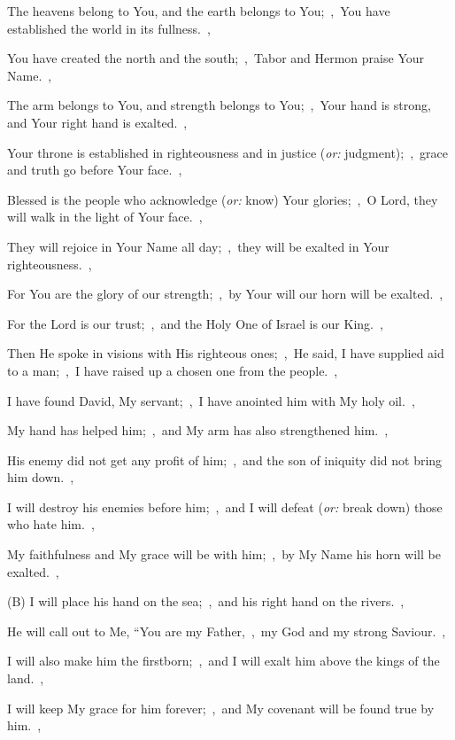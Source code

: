 \documentclass[12pt,twoside,a5paper]{article}
\newcommand{\translationoption}[1]{\emph{or:} #1}
\begin{document}
\begin{normalparskip}
  The heavens belong to You, and the earth belongs to You;~\sep\ You have established the world in its fullness.~\sep

  You have created the north and the south;~\sep\ Tabor and Hermon praise Your Name.~\sep

  The arm belongs to You, and strength belongs to You;~\sep\ Your hand is strong, and Your right hand is exalted.~\sep

  Your throne is established in righteousness and in justice (\translationoption{judgment});~\sep\ grace and truth go before Your face.~\sep

  Blessed is the people who acknowledge (\translationoption{know}) Your glories;~\sep\ O Lord, they will walk in the light of Your face.~\sep

  They will rejoice in Your Name all day;~\sep\ they will be exalted in Your righteousness.~\sep

  For You are the glory of our strength;~\sep\ by Your will our horn will be exalted.~\sep

  For the Lord is our trust;~\sep\ and the Holy One of Israel is our King.~\sep

  Then He spoke in visions with His righteous ones;~\sep\ He said, I have supplied aid to a man;~\sep\ I have raised up a chosen one from the people.~\sep

  I have found David, My servant;~\sep\ I have anointed him with My holy oil.~\sep

  My hand has helped him;~\sep\ and My arm has also strengthened him.~\sep

  His enemy did not get any profit of him;~\sep\ and the son of iniquity did not bring him down.~\sep

  I will destroy his enemies before him;~\sep\ and I will defeat (\translationoption{break down}) those who hate him.~\sep

  My faithfulness and My grace will be with him;~\sep\ by My Name his horn will be exalted.~\sep

  (B) I will place his hand on the sea;~\sep\ and his right hand on the rivers.~\sep

  He will call out to Me, ``You are my Father,~\sep\ my God and my strong Saviour.~\sep

  I will also make him the firstborn;~\sep\ and I will exalt him above the kings of the land.~\sep

  I will keep My grace for him forever;~\sep\ and My covenant will be found true by him.~\sep


\end{normalparskip}
\end{document}
